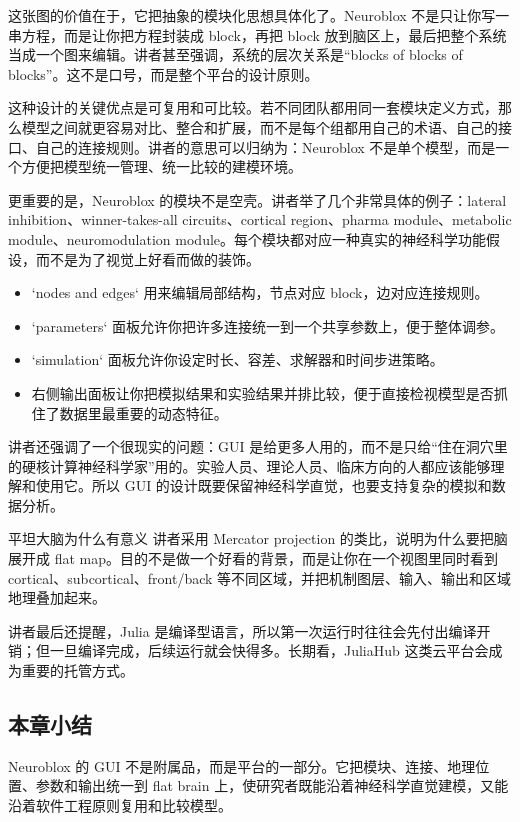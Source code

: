 \documentclass[a4paper]{article}
\begin{document}

这张图的价值在于，它把抽象的模块化思想具体化了。Neuroblox 不是只让你写一串方程，而是让你把方程封装成 block，再把 block 放到脑区上，最后把整个系统当成一个图来编辑。讲者甚至强调，系统的层次关系是“blocks of blocks of blocks”。这不是口号，而是整个平台的设计原则。

这种设计的关键优点是可复用和可比较。若不同团队都用同一套模块定义方式，那么模型之间就更容易对比、整合和扩展，而不是每个组都用自己的术语、自己的接口、自己的连接规则。讲者的意思可以归纳为：Neuroblox 不是单个模型，而是一个方便把模型统一管理、统一比较的建模环境。

更重要的是，Neuroblox 的模块不是空壳。讲者举了几个非常具体的例子：lateral inhibition、winner-takes-all circuits、cortical region、pharma module、metabolic module、neuromodulation module。每个模块都对应一种真实的神经科学功能假设，而不是为了视觉上好看而做的装饰。

\begin{itemize}
  \item `nodes and edges` 用来编辑局部结构，节点对应 block，边对应连接规则。
  \item `parameters` 面板允许你把许多连接统一到一个共享参数上，便于整体调参。
  \item `simulation` 面板允许你设定时长、容差、求解器和时间步进策略。
  \item 右侧输出面板让你把模拟结果和实验结果并排比较，便于直接检视模型是否抓住了数据里最重要的动态特征。
\end{itemize}

讲者还强调了一个很现实的问题：GUI 是给更多人用的，而不是只给“住在洞穴里的硬核计算神经科学家”用的。实验人员、理论人员、临床方向的人都应该能够理解和使用它。所以 GUI 的设计既要保留神经科学直觉，也要支持复杂的模拟和数据分析。

\begin{importantbox}{平坦大脑为什么有意义}
讲者采用 Mercator projection 的类比，说明为什么要把脑展开成 flat map。目的不是做一个好看的背景，而是让你在一个视图里同时看到 cortical、subcortical、front/back 等不同区域，并把机制图层、输入、输出和区域地理叠加起来。
\end{importantbox}

讲者最后还提醒，Julia 是编译型语言，所以第一次运行时往往会先付出编译开销；但一旦编译完成，后续运行就会快得多。长期看，JuliaHub 这类云平台会成为重要的托管方式。

\subsection{本章小结}
Neuroblox 的 GUI 不是附属品，而是平台的一部分。它把模块、连接、地理位置、参数和输出统一到 flat brain 上，使研究者既能沿着神经科学直觉建模，又能沿着软件工程原则复用和比较模型。
\end{document}
